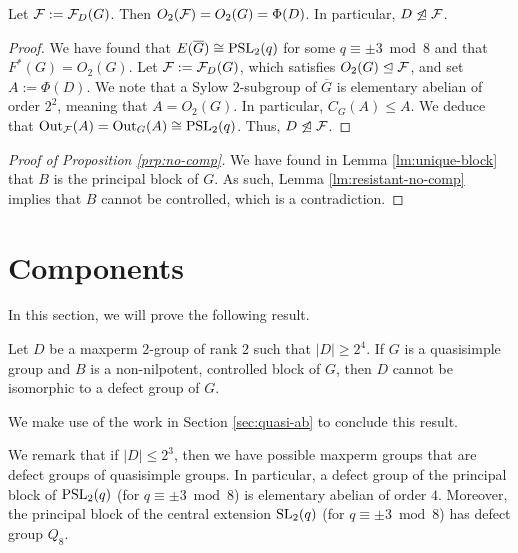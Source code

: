 \documentclass[bysection, amsart]{standard}
\begin{document}
\begin{lemma} \label{lm:resistant-no-comp}
    Let $\mathcal{F} := \mathcal{F}_D(G)$. Then $O_2(\mathcal{F}) = O_2(G) = \Phi(D)$. In particular, $D \not\trianglelefteq \mathcal{F}$.
\end{lemma}
\begin{proof}
    We have found that $E(\overline{G}) \cong \operatorname{PSL}_2(q)$ for some $q \equiv \pm 3 \bmod{8}$ and that $F^*(G) = O_2(G)$. Let $\mathcal{F} := \mathcal{F}_D(G)$, which satisfies $O_2(G) \trianglelefteq \mathcal{F}$, and set $A := \Phi(D)$. We note that a Sylow $2$-subgroup of $\overline{G}$ is elementary abelian of order $2^2$, meaning that $A = O_2(G)$. In particular, $C_G(A) \leq A$. We deduce that $\operatorname{Out}_{\mathcal{F}}(A) = \operatorname{Out}_G(A) \cong \operatorname{PSL}_2(q)$. Thus, $D \not\trianglelefteq \mathcal{F}$.
\end{proof}

\begin{proof}[Proof of Proposition \ref{prp:no-comp}]
    We have found in Lemma \ref{lm:unique-block} that $B$ is the principal block of $G$. As such, Lemma \ref{lm:resistant-no-comp} implies that $B$ cannot be controlled, which is a contradiction.
\end{proof}

\section{Components} \label{sec:comp}
In this section, we will prove the following result.

\begin{proposition} \label{prp:min-counter}
    Let $D$ be a maxperm $2$-group of rank $2$ such that $|D| \geq 2^4$. If $G$ is a quasisimple group and $B$ is a non-nilpotent, controlled block of $G$, then $D$ cannot be isomorphic to a defect group of $G$.
\end{proposition}
\noindent We make use of the work in Section \ref{sec:quasi-ab} to conclude this result.

We remark that if $|D| \leq 2^3$, then we have possible maxperm groups that are defect groups of quasisimple groups. In particular, a defect group of the principal block of $\operatorname{PSL}_2(q)$ (for $q \equiv \pm 3 \bmod{8}$) is elementary abelian of order $4$. Moreover, the principal block of the central extension $\operatorname{SL}_2(q)$ (for $q \equiv \pm 3 \bmod{8}$) has defect group $Q_8$. 
\end{document}

